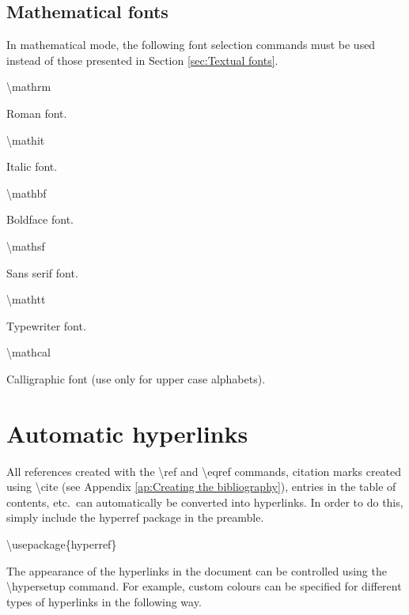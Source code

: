 \documentclass[twoside,openany]{thesis}
\begin{document}
\section{Mathematical fonts}\label{sec:Mathematical fonts}

In mathematical mode, the following font selection commands must be used instead of those presented in Section \ref{sec:Textual fonts}.

\begin{listing}

\item   {\ttfamily\textbackslash mathrm}

        Roman font.

\item   {\ttfamily\textbackslash mathit}

        Italic font.

\item   {\ttfamily\textbackslash mathbf}

        Boldface font.

\item   {\ttfamily\textbackslash mathsf}

        Sans serif font.

\item   {\ttfamily\textbackslash mathtt}

        Typewriter font.

\item   {\ttfamily\textbackslash mathcal}

        Calligraphic font (use only for upper case alphabets).

\end{listing}

\chapter{Automatic hyperlinks}\label{ap:Automatic hyperlinks}

All references created with the {\ttfamily\textbackslash ref} and {\ttfamily\textbackslash eqref} commands, citation marks created using {\ttfamily\textbackslash cite} (see Appendix \ref{ap:Creating the bibliography}), entries in the table of contents, etc.\ can automatically be converted into hyperlinks.
In order to do this, simply include the {\ttfamily hyperref} package in the preamble.

{\ttfamily\textbackslash usepackage\{hyperref\}}

The appearance of the hyperlinks in the document can be controlled using the {\ttfamily\textbackslash hypersetup} command.
For example, custom colours can be specified for different types of hyperlinks in the following way.
\end{document}
